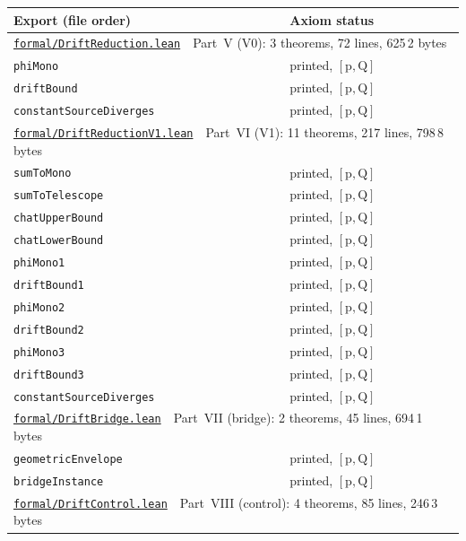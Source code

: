 \documentclass[11pt]{article}
\theoremstyle{plain}
\theoremstyle{definition}
\begin{document}
\begin{longtable}{p{} p{}}
\hline
\textbf{Export (file order)} & \textbf{Axiom status}\\
\hline
\endhead
\multicolumn{2}{l}{\hyperref[sec:reduction]{\texttt{formal/DriftReduction.lean}}\ \ Part~V (V0): 3 theorems, 72 lines, 625\,2 bytes}\\
\quad\texttt{phiMono} & printed, $[\mathrm{p},\mathrm{Q}]$\\
\quad\texttt{driftBound} & printed, $[\mathrm{p},\mathrm{Q}]$\\
\quad\texttt{constantSourceDiverges} & printed, $[\mathrm{p},\mathrm{Q}]$\\
\hline
\multicolumn{2}{l}{\hyperref[sec:reduction]{\texttt{formal/DriftReductionV1.lean}}\ \ Part~VI (V1): 11 theorems, 217 lines, 798\,8 bytes}\\
\quad\texttt{sumToMono} & printed, $[\mathrm{p},\mathrm{Q}]$\\
\quad\texttt{sumToTelescope} & printed, $[\mathrm{p},\mathrm{Q}]$\\
\quad\texttt{chatUpperBound} & printed, $[\mathrm{p},\mathrm{Q}]$\\
\quad\texttt{chatLowerBound} & printed, $[\mathrm{p},\mathrm{Q}]$\\
\quad\texttt{phiMono1} & printed, $[\mathrm{p},\mathrm{Q}]$\\
\quad\texttt{driftBound1} & printed, $[\mathrm{p},\mathrm{Q}]$\\
\quad\texttt{phiMono2} & printed, $[\mathrm{p},\mathrm{Q}]$\\
\quad\texttt{driftBound2} & printed, $[\mathrm{p},\mathrm{Q}]$\\
\quad\texttt{phiMono3} & printed, $[\mathrm{p},\mathrm{Q}]$\\
\quad\texttt{driftBound3} & printed, $[\mathrm{p},\mathrm{Q}]$\\
\quad\texttt{constantSourceDiverges} & printed, $[\mathrm{p},\mathrm{Q}]$\\
\hline
\multicolumn{2}{l}{\hyperref[sec:control]{\texttt{formal/DriftBridge.lean}}\ \ Part~VII (bridge): 2 theorems, 45 lines, 694\,1 bytes}\\
\quad\texttt{geometricEnvelope} & printed, $[\mathrm{p},\mathrm{Q}]$\\
\quad\texttt{bridgeInstance} & printed, $[\mathrm{p},\mathrm{Q}]$\\
\hline
\multicolumn{2}{l}{\hyperref[sec:control]{\texttt{formal/DriftControl.lean}}\ \ Part~VIII (control): 4 theorems, 85 lines, 246\,3 bytes}\\

\end{longtable}
\end{document}
